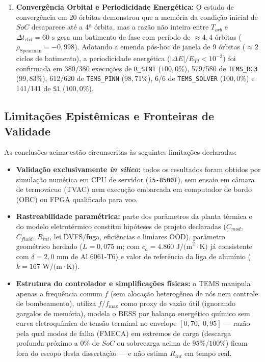 \begin{enumerate}[label=\textbf{\arabic*.},leftmargin=*]
    \item \textbf{Convergência Orbital e Periodicidade Energética:} O estudo de convergência em 20 órbitas demonstrou que a memória da condição inicial de $SoC$ desaparece até a 4ª órbita, mas a razão não inteira entre $T_{orb}$ e $\Delta t_{ctrl} = 60\text{ s}$ gera um batimento de fase com período de $\approx 4{,}4$ órbitas ($\rho_{\text{Spearman}} = -0{,}998$). Adotando a emenda pós-hoc de janela de 9 órbitas ($\approx 2$ ciclos de batimento), a periodicidade energética ($|\Delta E|/E_{TI} < 10^{-3}$) foi confirmada em 380/380 execuções de \texttt{R\_SINT} ($100{,}0\%$), 579/580 de \texttt{TEMS\_RC3} ($99{,}83\%$), 612/620 de \texttt{TEMS\_PINN} ($98{,}71\%$), 6/6 de \texttt{TEMS\_SOLVER} ($100{,}0\%$) e 141/141 de \texttt{S1} ($100{,}0\%$).
\end{enumerate}

\subsection{Limitações Epistêmicas e Fronteiras de Validade}
\label{sec:limitacoes_epistemicas_cap5}

As conclusões acima estão circunscritas às seguintes limitações declaradas:
\begin{itemize}[leftmargin=*]
    \item \textbf{Validação exclusivamente \textit{in silico}:} todos os resultados foram obtidos por simulação numérica em CPU de servidor (\texttt{i5-8500T}), sem ensaio em câmara de termovácuo (TVAC) nem execução embarcada em computador de bordo (OBC) ou FPGA qualificado para voo.
    \item \textbf{Rastreabilidade paramétrica:} parte dos parâmetros da planta térmica e do modelo eletrotérmico constitui hipóteses de projeto declaradas ($C_{mod}$, $C_{fluid}$, $R_{int}$, lei DVFS/fuga, eficiências e limiares OOD), parâmetro geométrico herdado ($L = 0{,}075\text{ m}$; com $c_a = 4.860\text{ J/(m}^2\cdot\text{K)}$ já consistente com $\delta = 2{,}0\text{ mm}$ de Al 6061-T6) e valor de referência da liga de alumínio ($k = 167\text{ W/(m}\cdot\text{K)}$).
    \item \textbf{Estrutura do controlador e simplificações físicas:} o TEMS manipula apenas a frequência comum $f$ (sem alocação heterogênea de nós nem controle de bombeamento), utiliza $f/f_{\max}$ como proxy de vazão útil (ignorando gargalos de memória), modela o BESS por balanço energético químico sem curva eletroquímica de tensão terminal no envelope $[0{,}70,\; 0{,}95]$ — razão pela qual modos de falha (FMECA) em extremos de carga (descarga profunda próximo a $0\%$ de $SoC$ ou sobrecarga acima de $95\%/100\%$) ficam fora do escopo desta dissertação — e não estima $R_{int}$ em tempo real.
\end{itemize}

